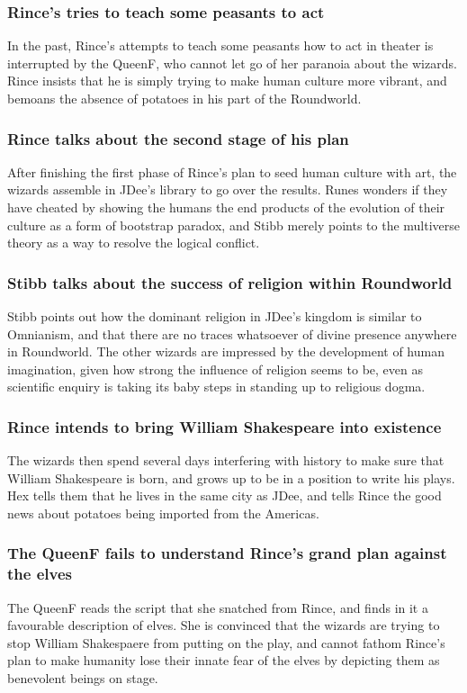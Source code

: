 \subsubsection{\Gls{Rince}'s tries to teach some peasants to act}
In the past, \Gls{Rince}'s attempts to teach some peasants how to act in theater is interrupted by
the \Gls{QueenF}, who cannot let go of her paranoia about the wizards. \Gls{Rince} insists that he
is simply trying to make human culture more vibrant, and bemoans the absence of potatoes in his
part of the Roundworld.

\subsubsection{\Gls{Rince} talks about the second stage of his plan}
After finishing the first phase of \Gls{Rince}'s plan to seed human culture with art, the wizards
assemble in \Gls{JDee}'s library to go over the results. \Gls{Runes} wonders if they have cheated
by showing the humans the end products of the evolution of their culture as a form of bootstrap
paradox, and \Gls{Stibb} merely points to the multiverse theory as a way to resolve the logical
conflict.

\subsubsection{\Gls{Stibb} talks about the success of religion within Roundworld}
\Gls{Stibb} points out how the dominant religion in \Gls{JDee}'s kingdom is similar to Omnianism,
and that there are no traces whatsoever of divine presence anywhere in Roundworld. The other wizards
are impressed by the development of human imagination, given how strong the influence of religion
seems to be, even as scientific enquiry is taking its baby steps in standing up to religious dogma.

\subsubsection{\Gls{Rince} intends to bring William Shakespeare into existence}
The wizards then spend several days interfering with history to make sure that William Shakespeare
is born, and grows up to be in a position to write his plays. \Gls{Hex} tells them that he lives in
the same city as \Gls{JDee}, and tells \Gls{Rince} the good news about potatoes being imported from
the Americas.

\subsubsection{The \Gls{QueenF} fails to understand \Gls{Rince}'s grand plan against the elves}
The \Gls{QueenF} reads the script that she snatched from \Gls{Rince}, and finds in it a favourable
description of elves. She is convinced that the wizards are trying to stop William Shakespaere from
putting on the play, and cannot fathom \Gls{Rince}'s plan to make humanity lose their innate fear of
the elves by depicting them as benevolent beings on stage.

